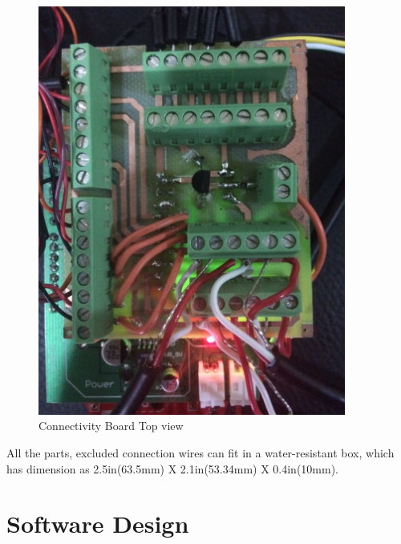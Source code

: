     \begin{figure}[H]
    \centering
    \includegraphics[width=0.9\textwidth]{con_board_top.jpg}
    \caption{\label{fig:Con Board}Connectivity Board Top view}
    \end{figure}
    All the parts, excluded connection wires can fit in a water-resistant box, which has dimension as 2.5in(63.5mm) X 2.1in(53.34mm) X 0.4in(10mm).

  
         

\newpage
\section{Software Design}


